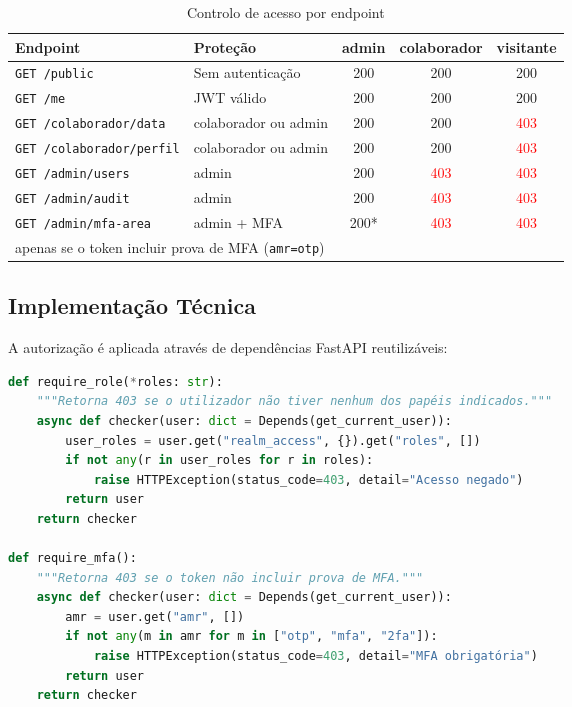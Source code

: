 \documentclass[12pt,a4paper]{article}
\begin{document}
\begin{table}[H]
  \centering
  \caption{Controlo de acesso por endpoint}
  \begin{tabularx}{\textwidth}{@{}lXccc@{}}
    \toprule
    \textbf{Endpoint} & \textbf{Proteção} & \textbf{admin} & \textbf{colaborador} & \textbf{visitante} \\
    \midrule
    \texttt{GET /public} & Sem autenticação & \textcolor{green!60!black}{200} & \textcolor{green!60!black}{200} & \textcolor{green!60!black}{200} \\
    \texttt{GET /me} & JWT válido & \textcolor{green!60!black}{200} & \textcolor{green!60!black}{200} & \textcolor{green!60!black}{200} \\
    \texttt{GET /colaborador/data} & colaborador ou admin & \textcolor{green!60!black}{200} & \textcolor{green!60!black}{200} & \textcolor{red}{403} \\
    \texttt{GET /colaborador/perfil} & colaborador ou admin & \textcolor{green!60!black}{200} & \textcolor{green!60!black}{200} & \textcolor{red}{403} \\
    \texttt{GET /admin/users} & admin & \textcolor{green!60!black}{200} & \textcolor{red}{403} & \textcolor{red}{403} \\
    \texttt{GET /admin/audit} & admin & \textcolor{green!60!black}{200} & \textcolor{red}{403} & \textcolor{red}{403} \\
    \texttt{GET /admin/mfa-area} & admin + MFA & \textcolor{green!60!black}{200*} & \textcolor{red}{403} & \textcolor{red}{403} \\
    \bottomrule
    \multicolumn{5}{l}{\small * apenas se o token incluir prova de MFA (\texttt{amr=otp})}
  \end{tabularx}
\end{table}

\subsection{Implementação Técnica}

A autorização é aplicada através de dependências FastAPI reutilizáveis:

\begin{lstlisting}[language=python, caption=Dependências de autorização em auth.py]
def require_role(*roles: str):
    """Retorna 403 se o utilizador não tiver nenhum dos papéis indicados."""
    async def checker(user: dict = Depends(get_current_user)):
        user_roles = user.get("realm_access", {}).get("roles", [])
        if not any(r in user_roles for r in roles):
            raise HTTPException(status_code=403, detail="Acesso negado")
        return user
    return checker

def require_mfa():
    """Retorna 403 se o token não incluir prova de MFA."""
    async def checker(user: dict = Depends(get_current_user)):
        amr = user.get("amr", [])
        if not any(m in amr for m in ["otp", "mfa", "2fa"]):
            raise HTTPException(status_code=403, detail="MFA obrigatória")
        return user
    return checker
\end{lstlisting}
\end{document}
